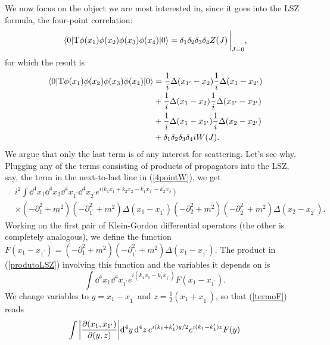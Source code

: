 We now focus on the object we are most interested in, since it goes into the LSZ formula, the four-point correlation:
\begin{equation}
    \vev{\text{T}\phi(x_1)\phi(x_2)\phi(x_3)\phi(x_4)}=\delta_1\delta_2\delta_3\delta_4 Z(J)\eval_{J=0},
\end{equation}
for which the result is
\begin{equation}
\begin{aligned}
     \vev{\text{T}\phi(x_1)\phi(x_2)\phi(x_3)\phi(x_4)}&=\frac{1}{i}\Delta(x_{1^\prime}-x_2)\frac{1}{i}\Delta(x_{1}-x_{2^\prime})\\&+\frac{1}{i}\Delta(x_{1}-x_2)\frac{1}{i}\Delta(x_{1^\prime}-x_{2^\prime})\\&+\frac{1}{i}\Delta(x_1-x_{1^\prime})\frac{1}{i}\Delta(x_2-x_{2^\prime})\\&+\delta_1\delta_2\delta_3\delta_4 i W(J).
     \label{4pointW}
\end{aligned}
\end{equation}
We argue that only the last term is of any interest for scattering. Let's see why. Plugging any of the  terms consisting of products of propagators into the LSZ, say, the term in the next-to-last line in (\ref{4pointW}), we get
\begin{equation}
    \begin{aligned}
    &i^2\int\dd^4x_1\dd^4x_2\dd^4x_{1^\prime}\dd^4x_{2^\prime}e^{i(k_1x_1+k_2x_2-k^\prime_1x_{1^\prime}-k_{2}^\prime x_{2^\prime}})&\\&\times(-\partial_1^2+m^2)(-\partial_{1^\prime}^2+m^2)\Delta(x_1-x_{1^\prime})(-\partial_2^2+m^2)(-\partial^2_{2^\prime}+m^2)\Delta(x_2-x_{2^\prime}).
    \end{aligned}
    \label{produtoLSZ}
\end{equation}
Working on the first pair of Klein-Gordon differential operators (the other is completely analogous), we define the function $F(x_1-x_{1^\prime})=(-\partial_1^2+m^2)(-\partial_{1^\prime}^2+m^2)\Delta(x_1-x_{1^\prime})$. The product in (\ref{produtoLSZ}) involving this function and the variables it depends on is
\begin{equation}
    \int\dd^4x_1\dd^4x_{1^\prime}e^{i(k_1x_1-k^\prime_1x_{1^\prime})}F(x_1-x_{1^\prime}).
    \label{termoF}
\end{equation}
We change variables to $y=x_1-x_{1^\prime}$ and $z=\frac{1}{2}(x_1+x_{1^\prime})$, so that (\ref{termoF}) reads
\begin{equation}
    \int\abs{\pdv{(x_1,x_{1^\prime})}{(y,z)}}\dd^4y\,\dd^4z\,e^{i(k_1+k_1^\prime)y/2}e^{i(k_1-k_1^\prime)z}F(y)
\end{equation}
